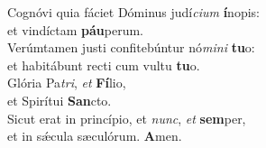 \oddverse Cognóvi quia fáciet Dóminus judí\textit{ci}\textit{um} \textbf{í}nopis:~\*\\
\oddverse et vindíctam \textbf{páu}perum.\\
\evenverse Verúmtamen justi confitebúntur nó\textit{mi}\textit{ni} \textbf{tu}o:~\*\\
\evenverse et habitábunt recti cum vultu \textbf{tu}o.\\
\oddverse Glória Pa\textit{tri}, \textit{et} \textbf{Fí}lio,~\*\\
\oddverse et Spirítui \textbf{San}cto.\\
\evenverse Sicut erat in princípio, et \textit{nunc}, \textit{et} \textbf{sem}per,~\*\\
\evenverse et in sǽcula sæculórum. \textbf{A}men.\\
